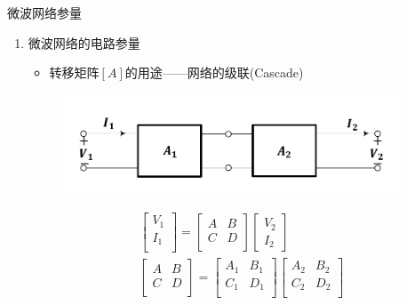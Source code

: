 \begin{frame}{微波网络参量}
    \begin{enumerate}
        \item 微波网络的电路参量
        \begin{itemize}
            \item 转移矩阵$[A]$的用途——网络的级联(Cascade)
        \end{itemize}
        \begin{figure}
            \includegraphics[width=10cm]{Cha5//fig5-9.pdf}
        \end{figure}
        \begin{gather*}
            \begin{bmatrix*}
                V_1 \\
                I_1 \\
            \end{bmatrix*}=
            \begin{bmatrix*}
                A & B \\
                C & D \\
            \end{bmatrix*}
            \begin{bmatrix*}
                V_2 \\
                I_2
            \end{bmatrix*}\\
            \begin{bmatrix*}
                A & B \\
                C & D \\
            \end{bmatrix*}=
            \begin{bmatrix*}
                A_1 & B_1 \\
                C_1 & D_1 \\
            \end{bmatrix*}
            \begin{bmatrix*}
                A_2 & B_2 \\
                C_2 & D_2 \\
            \end{bmatrix*}
        \end{gather*}
    \end{enumerate}
\end{frame}

